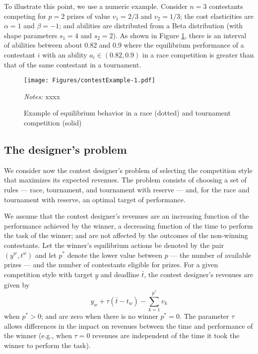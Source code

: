 \documentclass[10pt, titlepage]{article}
\newcommand\deadline{\bar{t}}
\newcommand\target{\underline{y}}
\begin{document}
To illustrate this point, we use a numeric example. Consider \(n=3\)
contestants competing for \(p=2\) prizes of value \(v_1=2/3\) and
\(v_2=1/3\); the cost elasticities are \(\alpha=1\) and \(\beta=-1\);
and abilities are distributed from a Beta distribution (with shape
parameters \(s_1=4\) and \(s_2=2\)). As shown in Figure
\ref{example contest}, there is an interval of abilities between about
0.82 and 0.9 where the equilibrium performance of a contestant \(i\)
with an ability \(a_i\in (0.82,0.9)\) in a race competition is greater
than that of the same contestant in a tournament.

\begin{figure}
\centering
\caption{Example of equilibrium behavior in a race (dotted) and tournament competition (solid)}
\label{example contest}
\texttt{[image: Figures/contestExample-1.pdf]}
\begin{minipage}{\textwidth}
\footnotesize\emph{Notes:} xxxx
\end{minipage}
\end{figure}

\subsection{The designer's problem}\label{the-designers-problem}

We consider now the contest designer's problem of selecting the
competition style that maximizes its expected revenues. The problem
consists of choosing a set of rules --- race, tournament, and tournament
with reserve --- and, for the race and tournament with reserve, an
optimal target of performance.

We assume that the contest designer's revenues are an increasing
function of the performance achieved by the winner, a decreasing
function of the time to perform the task of the winner; and are not
affected by the outcomes of the non-winning contestants. Let the
winner's equilibrium actions be denoted by the pair \((y^w, t^w)\) and
let \(p^*\) denote the lower value between \(p\) --- the number of
available prizes --- and the number of contestants eligible for prizes.
For a given competition style with target \(\target\) and deadline
\(\deadline\), the contest designer's revenues are given by \[
    y_w + \tau (\deadline - t_w) - \sum_{k=1}^{p^*} v_k 
\] when \(p^*>0\); and are zero when there is no winner \(p^*=0\). The
parameter \(\tau\) allows differences in the impact on revenues between
the time and performance of the winner (e.g., when \(\tau=0\) revenues
are independent of the time it took the winner to perform the task).
\end{document}
